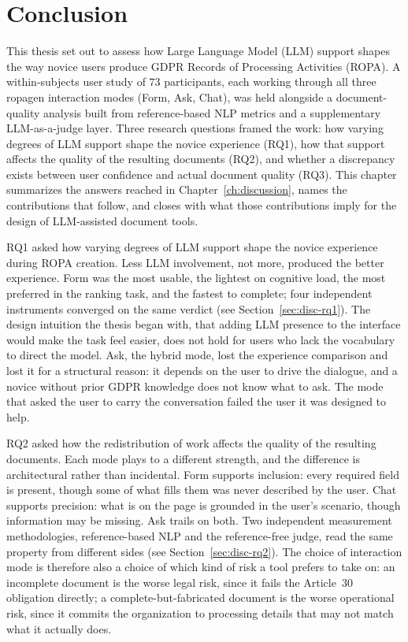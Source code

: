 \chapter{Conclusion}
\label{ch:conclusion}

This thesis set out to assess how Large Language Model (LLM)
support shapes the way novice users produce GDPR Records of
Processing Activities (ROPA). A within-subjects user study of
$73$ participants, each working through all three ropagen
interaction modes (Form, Ask, Chat), was held alongside a
document-quality analysis built from reference-based NLP
metrics and a supplementary LLM-as-a-judge layer. Three
research questions framed the work: how varying degrees of
LLM support shape the novice experience (RQ1), how that
support affects the quality of the resulting documents (RQ2),
and whether a discrepancy exists between user confidence and
actual document quality (RQ3). This chapter summarizes the
answers reached in Chapter~\ref{ch:discussion}, names the
contributions that follow, and closes with what those
contributions imply for the design of LLM-assisted document
tools.


RQ1 asked how varying degrees of LLM support shape the novice
experience during ROPA creation. Less LLM involvement, not
more, produced the better experience. Form was the most
usable, the lightest on cognitive load, the most preferred in
the ranking task, and the fastest to complete; four
independent instruments converged on the same verdict (see
Section~\ref{sec:disc-rq1}). The design intuition the thesis
began with, that adding LLM presence to the interface would
make the task feel easier, does not hold for users who lack
the vocabulary to direct the model. Ask, the hybrid mode,
lost the experience comparison and lost it for a structural
reason: it depends on the user to drive the dialogue, and a
novice without prior GDPR knowledge does not know what to
ask. The mode that asked the user to carry the conversation
failed the user it was designed to help.


RQ2 asked how the redistribution of work affects the quality
of the resulting documents. Each mode plays to a different
strength, and the difference is architectural rather than
incidental. Form supports inclusion: every required field is
present, though some of what fills them was never described
by the user. Chat supports precision: what is on the page
is grounded in the user's scenario, though information may be missing.
Ask trails on both. Two independent
measurement methodologies, reference-based NLP and the
reference-free judge, read the same property from different
sides (see Section~\ref{sec:disc-rq2}). The choice of
interaction mode is therefore also a choice of which kind of
risk a tool prefers to take on: an incomplete document is the
worse legal risk, since it fails the Article~30 obligation
directly; a complete-but-fabricated document is the worse
operational risk, since it commits the organization to
processing details that may not match what it actually does.


